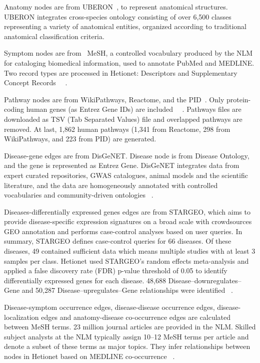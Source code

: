 Anatomy nodes are from \ac{UBERON}~\cite{mungall_uberon_2012}, to represent anatomical structures. \ac{UBERON} integrates cross-species ontology consisting of over 6,500 classes representing a variety of anatomical entities, organized according to traditional anatomical classification criteria.

Symptom nodes are from ~\ac{MeSH}, a controlled vocabulary produced by the \ac{NLM} for cataloging biomedical information, used to annotate PubMed and MEDLINE. Two record types are processed in Hetionet: Descriptors and Supplementary Concept Records ~\cite{himmelstein_user-friendly_2016}~\cite{himmelstein_mining_2015}.

Pathway nodes are from WikiPathways, Reactome, and the \ac{PID}~\cite{schaefer_pid:_2009}. Only protein-coding human genes (as Entrez Gene IDs) are included ~\cite{himmelstein_dhimmel/pathways_2016}~\cite{pinero_disgenet:_2015}. Pathways files are downloaded as TSV (Tab Separated Values) file and overlapped pathways are removed. At last, 1,862 human pathways (1,341 from Reactome, 298 from WikiPathways, and 223 from PID) are generated.

Disease-gene edges are from DisGeNET. Disease node is from Disease Ontology, and the gene is represented as Entrez Gene. DisGeNET integrates data from expert curated repositories, \ac{GWAS} catalogues, animal models and the scientific literature, and the data are homogeneously annotated with controlled vocabularies and community-driven ontologies ~\cite{pinero_disgenet:_2015}.

Diseases-differentially expressed genes edges are from STARGEO, which aims to provide disease-specific expression signatures on a broad scale with crowdsources \ac{GEO} annotation and performs case-control analyses based on user queries. In summary, STARGEO defines case-control queries for 66 diseases. Of these diseases, 49 contained sufficient data which means multiple studies with at least 3 samples per class. Hetionet used STARGEO's random effects meta-analysis and applied a false discovery rate (FDR) p-value threshold of 0.05 to identify differentially expressed genes for each disease. 48,688 Disease–downregulates–Gene and 50,287 Disease–upregulates–Gene relationships were identified ~\cite{himmelstein_stargeo_2015}.

Disease-symptom occurrence edges, disease-disease occurrence edges, disease-localization edges and anatomy-disease co-occurrence edges are calculated between \ac{MeSH} terms. 23 million journal articles are provided in the \ac{NLM}. Skilled subject analysts at the \ac{NLM} typically assign 10–12 \ac{MeSH} terms per article and denote a subset of these terms as major topics. They infer relationships between nodes in Hetionet based on MEDLINE co-occurrence ~\cite{himmelstein_mining_2015}.

